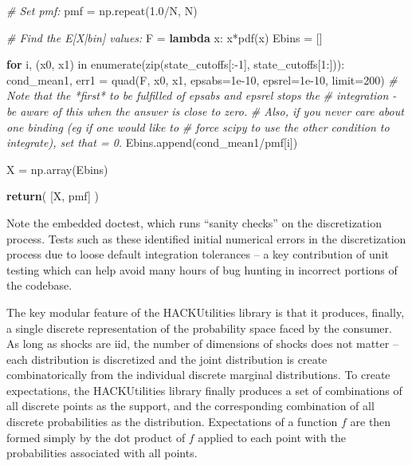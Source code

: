 \documentclass[]{article}
\newenvironment{Shaded}{}{}
\newcommand{\KeywordTok}[1]{\textcolor[rgb]{0.00,0.44,0.13}{\textbf{{#1}}}}
\newcommand{\DataTypeTok}[1]{\textcolor[rgb]{0.56,0.13,0.00}{{#1}}}
\newcommand{\DecValTok}[1]{\textcolor[rgb]{0.25,0.63,0.44}{{#1}}}
\newcommand{\FloatTok}[1]{\textcolor[rgb]{0.25,0.63,0.44}{{#1}}}
\newcommand{\CommentTok}[1]{\textcolor[rgb]{0.38,0.63,0.69}{\textit{{#1}}}}
\newcommand{\NormalTok}[1]{{#1}}
\begin{document}
\begin{Shaded}
\begin{Highlighting}[]
    \CommentTok{# Set pmf:}
    \NormalTok{pmf = np.repeat(}\FloatTok{1.0}\NormalTok{/N, N)}

    \CommentTok{# Find the E[X|bin] values:}
    \NormalTok{F = }\KeywordTok{lambda} \NormalTok{x: x*pdf(x)}
    \NormalTok{Ebins = []}

    \KeywordTok{for} \NormalTok{i, (x0, x1) in }\DataTypeTok{enumerate}\NormalTok{(}\DataTypeTok{zip}\NormalTok{(state_cutoffs[:-}\DecValTok{1}\NormalTok{], state_cutoffs[}\DecValTok{1}\NormalTok{:])):}
        \NormalTok{cond_mean1, err1 = quad(F, x0, x1, epsabs=}\FloatTok{1e-10}\NormalTok{, epsrel=}\FloatTok{1e-10}\NormalTok{, limit=}\DecValTok{200}\NormalTok{)}
        \CommentTok{# Note that the *first* to be fulfilled of epsabs and epsrel stops the}
        \CommentTok{# integration - be aware of this when the answer is close to zero.}
        \CommentTok{# Also, if you never care about one binding (eg if one would like to}
        \CommentTok{# force scipy to use the other condition to integrate), set that = 0.}
        \NormalTok{Ebins.append(cond_mean1/pmf[i])}

    \NormalTok{X = np.array(Ebins)}

    \KeywordTok{return}\NormalTok{( [X, pmf] )}
\end{Highlighting}
\end{Shaded}

Note the embedded doctest, which runs ``sanity checks'' on the
discretization process. Tests such as these identified initial numerical
errors in the discretization process due to loose default integration
tolerances -- a key contribution of unit testing which can help avoid
many hours of bug hunting in incorrect portions of the codebase.
\href{In\%20addition\%20to\%20expectation-formation,\%20this\%20module\%20implements\%20functions\%20to\%20estimate\%20the\%20welfare\%20loss\%20due\%20to\%20function\%20approximation,\%20as\%20employed\%20in\%20Allen\%20and\%20Carroll\%20(2001),\%20and\%20functions\%20to\%20implement\%20variance-reduction\%20methods\%20for\%20the\%20Monte\%20Carlo\%20simulation\%20portion\%20of\%20the\%20SMM\%20routine.}{}

The key modular feature of the HACKUtilities library is that it
produces, finally, a single discrete representation of the probability
space faced by the consumer. As long as shocks are iid, the number of
dimensions of shocks does not matter -- each distribution is discretized
and the joint distribution is create combinatorically from the
individual discrete marginal distributions. To create expectations, the
HACKUtilities library finally produces a set of combinations of all
discrete points as the support, and the corresponding combination of all
discrete probabilities as the distribution. Expectations of a function
$f$ are then formed simply by the dot product of $f$ applied to each
point with the probabilities associated with all points.
\end{document}
